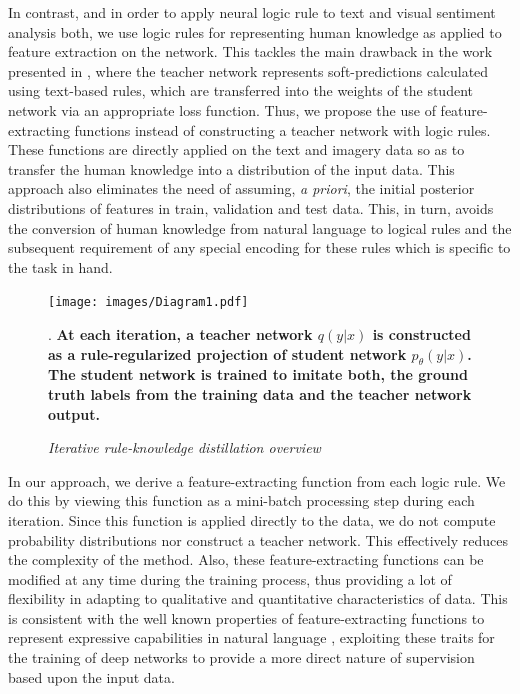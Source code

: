 \documentclass[12pt,a4paper]{article}
\begin{document}
In contrast, and in order to apply neural logic rule to text and visual sentiment analysis both, we use logic rules for representing human knowledge as applied to feature extraction on the network. This tackles the main drawback in the work presented in \cite{Hu:2019}, where the teacher network represents soft-predictions calculated using text-based rules, which are transferred into the weights of the student network via an appropriate loss function. Thus, we propose the use of feature-extracting functions instead of constructing a teacher network with logic rules. These functions are directly applied on the text and imagery data so as to transfer the human knowledge into a distribution of the input data. This approach also eliminates the need of assuming, {\it a priori}, the initial posterior distributions of features in train, validation and test data. This, in turn, avoids the conversion of human knowledge from natural language to logical rules and the subsequent requirement of any special encoding for these rules which is specific to the task in hand.
\vspace{2 mm}

\begin{figure}
\vspace{-5mm}
\begin{center}
\texttt{[image: images/Diagram1.pdf]}
\end{center}
\caption{\textit{Iterative rule-knowledge distillation overview}} \cite{Hu:2019}. \textbf{At each iteration, a teacher network \begin{math}q(y|x)\end{math} is  constructed as a rule-regularized projection of student network \begin{math}p_\theta(y|x)\end{math}. The student network is trained to imitate both, the ground truth labels from the training data and the teacher network output.}
\label{fig:02}
\vspace{-3mm}
\end{figure}

In our approach, we derive a feature-extracting function from each logic rule. We do this by viewing this function as a mini-batch processing step during each iteration. Since this function is applied directly to the data, we do not compute probability distributions nor construct a teacher network. This effectively reduces the complexity of the method. Also, these feature-extracting functions can be modified at any time during the training process, thus providing a lot of flexibility in adapting to qualitative and quantitative characteristics of data. This is consistent with the well known properties of feature-extracting functions to represent expressive capabilities in natural language \cite{lewis:92}, exploiting these traits for the training of deep networks to provide a more direct nature of supervision based upon the input data.
\vspace{2 mm}
\end{document}
